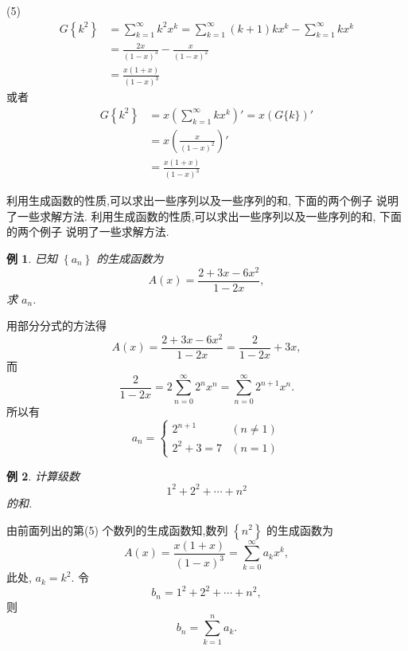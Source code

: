 \documentclass[punct]{ctexbeamer}
\newtheorem{ex}{例}[section]
\def\sol{\noindent {\bf 解\ }}
\begin{document}
\begin{frame}
	(5)
$$
\begin{aligned}
    G\left\{k^{2}\right\} &=\sum_{k=1}^{\infty} k^{2} x^{k} =\sum_{k=1}^{\infty}(k+1) k x^{k}-\sum_{k=1}^{\infty} k x^{k} \\
    &=\frac{2 x}{(1-x)^{3}}-\frac{x}{(1-x)^{2}} \\
    &=\frac{x(1+x)}{(1-x)^{3}}
\end{aligned}
$$
或者
\begin{align*}
  G\left\{k^{2}\right\} &= x \left( \sum_{k=1}^{\infty} k x^{k}\right)' =x \left( G\{k\} \right)'\\
&=x \left( \frac{x}{(1-x)^{2}} \right)' \\
&=\frac{x(1+x)}{(1-x)^{3}}
\end{align*}

利用生成函数的性质,可以求出一些序列以及一些序列的和, 下面的两个例子 说明了一些求解方法.
	利用生成函数的性质,可以求出一些序列以及一些序列的和, 下面的两个例子 说明了一些求解方法.
\end{frame}

\begin{frame}
	\begin{ex}
		已知 $\left\{a_{n}\right\}$ 的生成函数为
		$$
		A(x)=\frac{2+3 x-6 x^{2}}{1-2 x},
		$$
		求 $a_{n}$.
	\end{ex}
\pause
\sol 用部分分式的方法得
$$
A(x)=\frac{2+3 x-6 x^{2}}{1-2 x}=\frac{2}{1-2 x}+3 x,
$$
而
$$
\frac{2}{1-2 x}=2 \sum_{n=0}^{\infty} 2^{n} x^{n}=\sum_{n=0}^{\infty} 2^{n+1} x^{n}.
$$
所以有
$$
a_{n}=\left\{\begin{array}{ll}
2^{n+1} & (n \neq 1) \\
2^{2}+3=7 & (n=1)
\end{array}\right.
$$
\end{frame}

\begin{frame}
	\begin{ex}
		计算级数
		$$
		1^{2}+2^{2}+\cdots+n^{2}
		$$
		的和.
	\end{ex}
\pause
\sol 由前面列出的第(5) 个数列的生成函数知,数列 $\left\{n^{2}\right\}$ 的生成函数为
$$
A(x)=\frac{x(1+x)}{(1-x)^{3}}=\sum_{k=0}^{\infty} a_{k} x^{k},
$$
此处, $a_{k}=k^{2}$. 令
$$
b_{n}=1^{2}+2^{2}+\cdots+n^{2},
$$
则
$$
b_{n}=\sum_{k=1}^{n} a_{k}.
$$
\end{frame}
\end{document}
